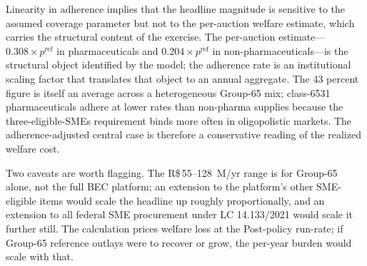 

Linearity in adherence implies that the headline magnitude is sensitive to the assumed coverage parameter but not to the per-auction welfare estimate, which carries the structural content of the exercise. The per-auction estimate---$0.308 \times p^{\mathrm{ref}}$ in pharmaceuticals and $0.204 \times p^{\mathrm{ref}}$ in non-pharmaceuticals---is the structural object identified by the model; the adherence rate is an institutional scaling factor that translates that object to an annual aggregate. The 43 percent figure is itself an average across a heterogeneous Group-65 mix; class-6531 pharmaceuticals adhere at lower rates than non-pharma supplies because the three-eligible-SMEs requirement binds more often in oligopolistic markets. The adherence-adjusted central case is therefore a conservative reading of the realized welfare cost.

Two caveats are worth flagging. The R\$\,55--128~M/yr range is for Group-65 alone, not the full BEC platform; an extension to the platform's other SME-eligible items would scale the headline up roughly proportionally, and an extension to all federal SME procurement under LC 14.133/2021 would scale it further still. The calculation prices welfare loss at the Post-policy run-rate; if Group-65 reference outlays were to recover or grow, the per-year burden would scale with that.
